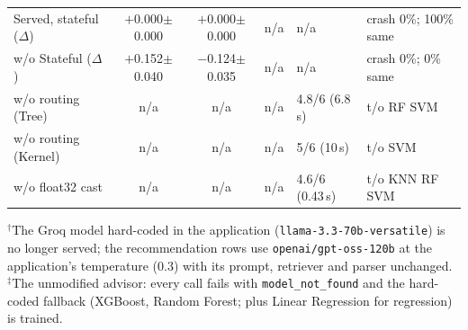 \begin{table}[t]
\begin{tabular}{@{}lcccl>{\raggedright\arraybackslash}p{2.0cm}@{}}
Served, stateful ($\Delta$) & $+$0.000$\pm$0.000 & $+$0.000$\pm$0.000 & n/a & n/a & crash 0\%; 100\% same \\
\quad w/o Stateful ($\Delta$) & $+$0.152$\pm$0.040 & $-$0.124$\pm$0.035 & n/a & n/a & crash 0\%; 0\% same \\
\quad w/o routing (Tree) & n/a & n/a & n/a & 4.8/6 (6.8\,s) & t/o RF SVM \\
\quad w/o routing (Kernel) & n/a & n/a & n/a & 5/6 (10\,s) & t/o SVM \\
\quad w/o float32 cast & n/a & n/a & n/a & 4.6/6 (0.43\,s) & t/o KNN RF SVM \\
\hline
\end{tabular}
\par\smallskip
\parbox{\textwidth}{\scriptsize $^\dagger$The Groq model hard-coded in the application (\texttt{llama-3.3-70b-versatile}) is no longer served; the recommendation rows use \texttt{openai/\allowbreak gpt-oss-120b} at the application's temperature (0.3) with its prompt, retriever and parser unchanged. $^\ddagger$The unmodified advisor: every call fails with \texttt{model\_not\_found} and the hard-coded fallback (XGBoost, Random Forest; plus Linear Regression for regression) is trained.}
\end{table}
